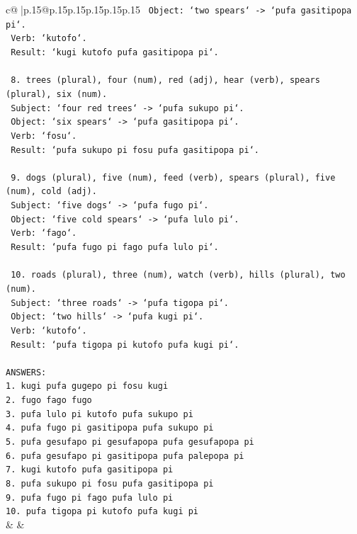 \documentclass{article}
\begin{document}
{\begin{supertabular}{c@{$\;$}|p{.15\linewidth}@{}p{.15\linewidth}p{.15\linewidth}p{.15\linewidth}p{.15\linewidth}p{.15\linewidth}}
{{{\texttt{       Object: `two spears` {-}> `pufa gasitipopa pi`.} \\
\texttt{       Verb: `kutofo`.} \\
\texttt{       Result: `kugi kutofo pufa gasitipopa pi`.} \\
\\ 
\texttt{    8. trees (plural), four (num), red (adj), hear (verb), spears (plural), six (num).} \\
\texttt{       Subject: `four red trees` {-}> `pufa sukupo pi`.} \\
\texttt{       Object: `six spears` {-}> `pufa gasitipopa pi`.} \\
\texttt{       Verb: `fosu`.} \\
\texttt{       Result: `pufa sukupo pi fosu pufa gasitipopa pi`.} \\
\\ 
\texttt{    9. dogs (plural), five (num), feed (verb), spears (plural), five (num), cold (adj).} \\
\texttt{       Subject: `five dogs` {-}> `pufa fugo pi`.} \\
\texttt{       Object: `five cold spears` {-}> `pufa lulo pi`.} \\
\texttt{       Verb: `fago`.} \\
\texttt{       Result: `pufa fugo pi fago pufa lulo pi`.} \\
\\ 
\texttt{    10. roads (plural), three (num), watch (verb), hills (plural), two (num).} \\
\texttt{        Subject: `three roads` {-}> `pufa tigopa pi`.} \\
\texttt{        Object: `two hills` {-}> `pufa kugi pi`.} \\
\texttt{        Verb: `kutofo`.} \\
\texttt{        Result: `pufa tigopa pi kutofo pufa kugi pi`.} \\
\\ 
\texttt{ANSWERS:} \\
\texttt{1. kugi pufa gugepo pi fosu kugi} \\
\texttt{2. fugo fago fugo} \\
\texttt{3. pufa lulo pi kutofo pufa sukupo pi} \\
\texttt{4. pufa fugo pi gasitipopa pufa sukupo pi} \\
\texttt{5. pufa gesufapo pi gesufapopa pufa gesufapopa pi} \\
\texttt{6. pufa gesufapo pi gasitipopa pufa palepopa pi} \\
\texttt{7. kugi kutofo pufa gasitipopa pi} \\
\texttt{8. pufa sukupo pi fosu pufa gasitipopa pi} \\
\texttt{9. pufa fugo pi fago pufa lulo pi} \\
\texttt{10. pufa tigopa pi kutofo pufa kugi pi} \\
            }
        }
    }
    & & \\ \\


\end{supertabular}}
\end{document}
